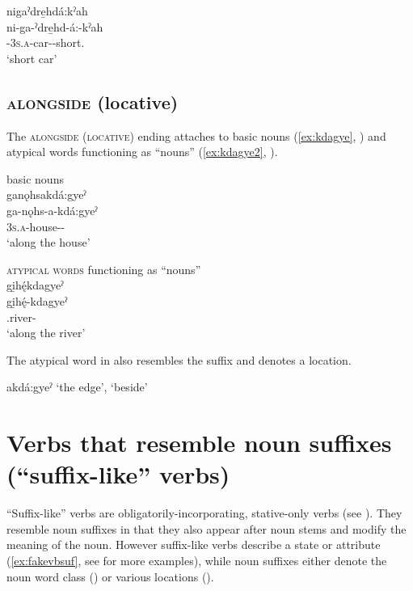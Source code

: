 \ea\label{ex:kaloc3} 
nigaˀdre̱hdá:kˀah\\
\gll ni-ga-ˀdre̱hd-á:-kˀah\\
{\partitive}-\textsc{3s.a}-car-{\joinerA}-short.{\stative}\\
\glt ‘short car’
\z

\subsection{ \textsc{alongside} (locative)} \label{[-kdagyeˀ]}
The  \textsc{alongside} \textsc{(locative)} ending attaches to basic nouns (\ref{ex:kdagye}, ) and atypical words functioning as “nouns” (\ref{ex:kdagye2}, ).

\ea\label{ex:kdagye} basic nouns\\
ganǫhsakdá:gyeˀ\\
\gll ga-nǫhs-a-kdá:gyeˀ\\
 \textsc{3s.a}-house-{\joinerA}-\\
\glt `along the house'
\z


\ea\label{ex:kdagye2} \textsc{atypical words} functioning as “nouns”\\
gi̱hę́kdagyeˀ\\
\gll gi̱hę́-kdagyeˀ\\
 {\noprefix}.river-\\
\glt `along the river'
\z


\newpage
The atypical word in  also resembles the   suffix and denotes a location.

\ea\label{ex:kdagye3} 
akdá:gyeˀ ‘the edge’, ‘beside’
\z

\section{Verbs that resemble noun suffixes (“suffix-like” verbs)} \label{Verbs that resemble noun suffixes}
“Suffix-like” verbs are obligatorily-incorporating, stative-only verbs (see ). They resemble noun suffixes in that they also appear after noun stems and modify the meaning of the noun. However suffix-like verbs describe a state or attribute (\ref{ex:fakevbsuf}, see  for more examples), while noun suffixes either denote the noun word class () or various locations (). 

